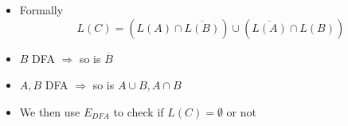 \begin{frame}[allowframebreaks]
\begin{itemize}
\item Formally
  \begin{equation*}
    L(C)
=(L(A)\cap \overline{L(B)})\cup
(\overline{L(A)}\cap L(B))
  \end{equation*}
\item 
$B$ DFA $\Rightarrow$ so is $\overline{B}$

\item $A, B$ DFA $\Rightarrow$ so is 
$A\cup B, A\cap B$

\item We then use $E_{DFA}$ to check if 
$  L(C)=\emptyset $ or not
\end{itemize}\end{frame}



